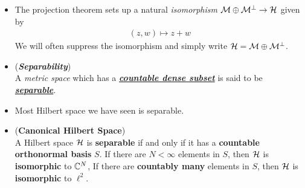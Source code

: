 \documentclass[11pt]{article}
\begin{document}
\begin{itemize}
\item \begin{remark}
The projection theorem sets up a natural \emph{isomorphism} ${\mathcal M} \oplus {\mathcal M}^{\bot} \rightarrow {\mathcal H} $ given by
\begin{align*}
(z, w) \mapsto z + w
\end{align*}
We will often suppress the isomorphism and simply write ${\mathcal H} = {\mathcal M} \oplus {\mathcal M}^{\bot}$.
\end{remark}

\item \begin{definition} (\emph{\textbf{Separability}})\\
A \emph{metric space} which has a \underline{\emph{\textbf{countable dense subset}}} is said to be \underline{\emph{\textbf{separable}}}.
\end{definition}

\item \begin{remark}
Most Hilbert space we have seen is separable.
\end{remark}

\item \begin{proposition} (\textbf{Canonical Hilbert Space})\\
A Hilbert space ${\mathcal H}$ is \textbf{separable} if and only if it has a \textbf{countable orthonormal basis} $S$. If there are $N < \infty$ elements in $S$, then ${\mathcal H}$ is
\textbf{isomorphic} to ${\mathbb C}^N$, If there are \textbf{countably many} elements in $S$, then ${\mathcal H}$ is \textbf{isomorphic} to $\ell^{2}$.
\end{proposition}
\end{itemize}
\end{document}
